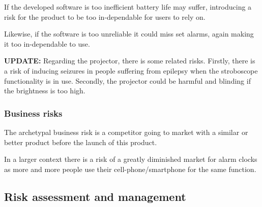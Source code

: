 \documentclass[Main]{subfiles}
\begin{document}
		If the developed software is too inefficient battery life may suffer, introducing a risk for the product to be too in-dependable for users to rely on.

		Likewise, if the software is too unreliable it could miss set alarms, 
		again making it too in-dependable to use.

		\textbf{UPDATE:}
		Regarding the projector, there is some related risks.
		Firstly, there is a risk of inducing seizures in people suffering from epilepsy when the stroboscope functionality is in use.
		Secondly, the projector could be harmful and blinding if the brightness is too high.



		\subsubsection{Business risks} %
		\label{sub:business_risks}

		The archetypal business risk is a competitor going to market with a similar or better product before the launch of this product.

		In a larger context there is a risk of a greatly diminished market for alarm clocks as more and more people use their cell-phone/smartphone for the same function.






	\subsection{Risk assessment and management} %
	\label{sub:risk_assessment_and_management}
\end{document}
